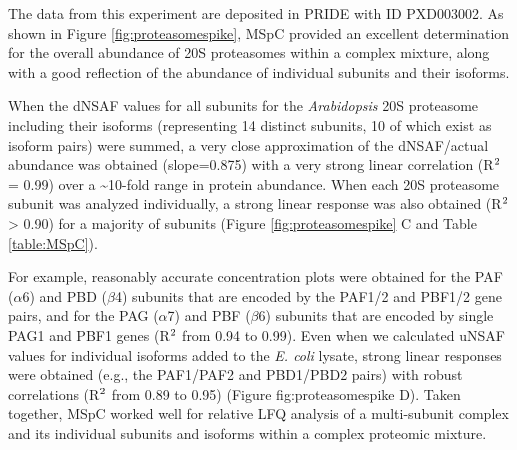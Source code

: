 The data from this experiment are deposited in PRIDE with ID PXD003002.
As shown in Figure \ref{fig:proteasomespike}, MSpC provided an excellent determination for the overall abundance of 20S proteasomes within a complex mixture, along with a good reflection of the abundance of individual subunits and their isoforms.

When the dNSAF values for all subunits for the \textit{Arabidopsis} 20S proteasome including their isoforms (representing 14 distinct subunits, 10 of which exist as isoform pairs) were summed, a very close approximation of the dNSAF/actual abundance was obtained (slope=0.875) with a very strong linear correlation (R$\textsuperscript{2}$ = 0.99) over a \textasciitilde10-fold range in protein abundance.  
When each 20S proteasome subunit was analyzed individually, a strong linear response was also obtained (R$\textsuperscript{2}$ > 0.90) for a majority of subunits (Figure \ref{fig:proteasomespike} C and Table \ref{table:MSpC}).

For example, reasonably accurate concentration plots were obtained for the PAF ($\alpha$6) and PBD ($\beta$4) subunits that are encoded by the PAF1/2 and PBF1/2 gene pairs, and for the PAG ($\alpha$7) and PBF ($\beta$6) subunits that are encoded by single PAG1 and PBF1 genes (R$\textsuperscript{2}$  from 0.94 to 0.99).
Even when we calculated uNSAF values for individual isoforms added to the \textit{E. coli} lysate, strong linear responses were obtained (e.g., the PAF1/PAF2 and PBD1/PBD2 pairs) with robust correlations (R$\textsuperscript{2}$ from 0.89 to 0.95) (Figure {fig:proteasomespike} D).
Taken together, MSpC worked well for relative LFQ analysis of a multi-subunit complex and its individual subunits and isoforms within a complex proteomic mixture.

